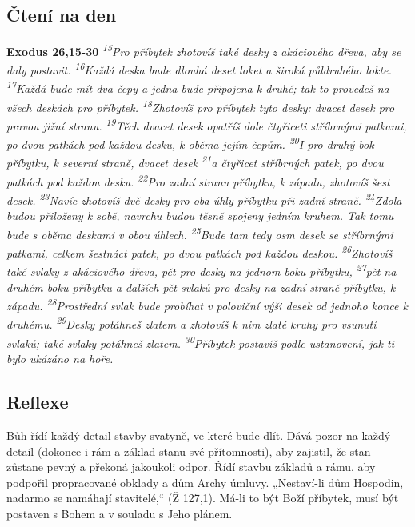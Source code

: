 \documentclass[11pt]{article}
\begin{document}
\subsection*{Čtení na den}
\textbf{Exodus 26,15-30}
\newline
\textit{
\textsuperscript{15}Pro příbytek zhotovíš také desky z akáciového dřeva, aby se daly postavit.
\textsuperscript{16}Každá deska bude dlouhá deset loket a široká půldruhého lokte.
\textsuperscript{17}Každá bude mít dva čepy a jedna bude připojena k druhé; tak to provedeš na všech deskách pro příbytek.
\textsuperscript{18}Zhotovíš pro příbytek tyto desky: dvacet desek pro pravou jižní stranu.
\textsuperscript{19}Těch dvacet desek opatříš dole čtyřiceti stříbrnými patkami, po dvou patkách pod každou desku, k oběma jejím čepům.
\textsuperscript{20}I pro druhý bok příbytku, k severní straně, dvacet desek
\textsuperscript{21}a čtyřicet stříbrných patek, po dvou patkách pod každou desku.
\textsuperscript{22}Pro zadní stranu příbytku, k západu, zhotovíš šest desek.
\textsuperscript{23}Navíc zhotovíš dvě desky pro oba úhly příbytku při zadní straně.
\textsuperscript{24}Zdola budou přiloženy k sobě, navrchu budou těsně spojeny jedním kruhem. Tak tomu bude s oběma deskami v obou úhlech.
\textsuperscript{25}Bude tam tedy osm desek se stříbrnými patkami, celkem šestnáct patek, po dvou patkách pod každou deskou.
\textsuperscript{26}Zhotovíš také svlaky z akáciového dřeva, pět pro desky na jednom boku příbytku,
\textsuperscript{27}pět na druhém boku příbytku a dalších pět svlaků pro desky na zadní straně příbytku, k západu.
\textsuperscript{28}Prostřední svlak bude probíhat v poloviční výši desek od jednoho konce k druhému.
\textsuperscript{29}Desky potáhneš zlatem a zhotovíš k nim zlaté kruhy pro vsunutí svlaků; také svlaky potáhneš zlatem.
\textsuperscript{30}Příbytek postavíš podle ustanovení, jak ti bylo ukázáno na hoře.
}

\subsection*{Reflexe}
Bůh řídí každý detail stavby svatyně, ve které bude dlít. Dává pozor na každý detail (dokonce i rám a základ stanu své
přítomnosti), aby zajistil, že stan zůstane pevný a překoná jakoukoli odpor. Řídí stavbu základů a rámu, aby podpořil propracované
obklady a dům Archy úmluvy. „Nestaví-li dům Hospodin, nadarmo se namáhají stavitelé,“ (Ž 127,1). Má-li to být Boží příbytek,
musí být postaven s Bohem a v souladu s Jeho plánem.
\end{document}
